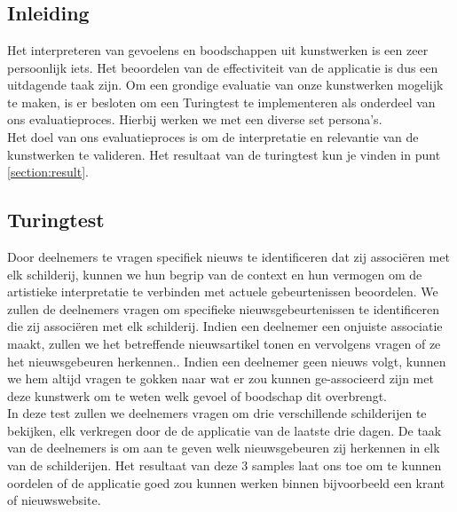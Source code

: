 \chapter{}%
\label{ch:evaluatieproces}
\section{Inleiding}
Het interpreteren van gevoelens en boodschappen uit kunstwerken is een zeer persoonlijk iets. Het beoordelen van de effectiviteit van de applicatie is dus een uitdagende taak zijn. Om een grondige evaluatie van onze kunstwerken mogelijk te maken, is er besloten om een Turingtest te implementeren als onderdeel van ons evaluatieproces. Hierbij werken we met een diverse set persona's. \\

Het doel van ons evaluatieproces is om de interpretatie en relevantie van de kunstwerken te valideren. Het resultaat van de turingtest kun je vinden in punt \ref{section:result}.

\section{Turingtest}
\label{sec:turingtest}
 Door deelnemers te vragen specifiek nieuws te identificeren dat zij associëren met elk schilderij, kunnen we hun begrip van de context en hun vermogen om de artistieke interpretatie te verbinden met actuele gebeurtenissen beoordelen. We zullen de deelnemers vragen om specifieke nieuwsgebeurtenissen te identificeren die zij associëren met elk schilderij.  Indien een deelnemer een onjuiste associatie maakt, zullen we het betreffende nieuwsartikel tonen en vervolgens vragen of ze het nieuwsgebeuren herkennen.. Indien een deelnemer geen nieuws volgt, kunnen we hem altijd vragen te gokken naar wat er zou kunnen ge-associeerd zijn met deze kunstwerk om te weten welk gevoel of boodschap dit overbrengt. \\
 
 In deze test zullen we deelnemers vragen om drie verschillende schilderijen te bekijken, elk verkregen door de de applicatie van de laatste drie dagen. De taak van de deelnemers is om aan te geven welk nieuwsgebeuren zij herkennen in elk van de schilderijen. Het resultaat van deze 3 samples laat ons toe om te kunnen oordelen of de applicatie goed zou kunnen werken binnen bijvoorbeeld een krant of nieuwswebsite.  \\
 
